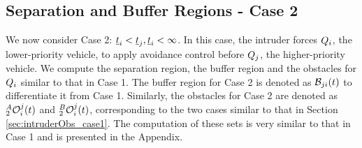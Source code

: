 \subsection{Separation and Buffer Regions - Case 2} \label{sec:case2_maintext}
We now consider Case 2: $\underline{t}_i < \underline{t}_j, \underline{t}_i <\infty$. In this case, the intruder forces $Q_i$, the lower-priority vehicle, to apply avoidance control before $Q_j$, the higher-priority vehicle.  We compute the separation region, the buffer region and the obstacles for $Q_i$ similar to that in Case 1. The buffer region for Case 2 is denoted as $\mathcal{B}_{ji}(t)$ to differentiate it from Case 1. Similarly, the obstacles for Case 2 are denoted as $_2^A\mathcal{O}_i^j(t)$ and $_2^B\mathcal{O}_i^j(t)$, corresponding to the two cases similar to that in Section \eqref{sec:intruderObs_case1}. The computation of these sets is very similar to that in Case 1 and is presented in the Appendix. 